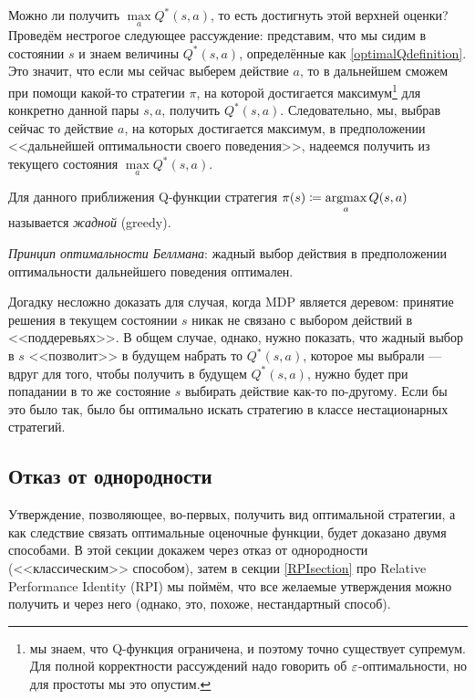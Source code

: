 Можно ли получить $\max\limits_{a} Q^*(s, a)$, то есть достигнуть этой верхней оценки? Проведём нестрогое следующее рассуждение: представим, что мы сидим в состоянии $s$ и знаем величины $Q^*(s, a)$, определённые как \eqref{optimalQdefinition}. Это значит, что если мы сейчас выберем действие $a$, то в дальнейшем сможем при помощи какой-то стратегии $\pi$, на которой достигается максимум\footnote{мы знаем, что Q-функция ограничена, и поэтому точно существует супремум. Для полной корректности рассуждений надо говорить об $\varepsilon$-оптимальности, но для простоты мы это опустим.} для конкретно данной пары $s, a$, получить $Q^*(s, a)$. Следовательно, мы, выбрав сейчас то действие $a$, на которых достигается максимум, в предположении <<дальнейшей оптимальности своего поведения>>, надеемся получить из текущего состояния $\max\limits_a Q^*(s, a)$.

\begin{definition}\label{greedy}
Для данного приближения Q-функции стратегия $\pi(s) \coloneqq \mathop{\mathrm{argmax}}\limits_a Q(s, a)$ называется \emph{жадной} (greedy).
\end{definition}

\begin{definition}
\emph{Принцип оптимальности Беллмана}: жадный выбор действия в предположении оптимальности дальнейшего поведения оптимален.
\end{definition}

Догадку несложно доказать для случая, когда MDP является деревом: принятие решения в текущем состоянии $s$ никак не связано с выбором действий в <<поддеревьях>>. В общем случае, однако, нужно показать, что жадный выбор в $s$ <<позволит>> в будущем набрать то $Q^*(s, a)$, которое мы выбрали --- вдруг для того, чтобы получить в будущем $Q^*(s, a)$, нужно будет при попадании в то же состояние $s$ выбирать действие как-то по-другому. Если бы это было так, было бы оптимально искать стратегию в классе нестационарных стратегий.

\subsection{Отказ от однородности}

Утверждение, позволяющее, во-первых, получить вид оптимальной стратегии, а как следствие связать оптимальные оценочные функции, будет доказано двумя способами. В этой секции докажем через отказ от однородности (<<классическим>> способом), затем в секции \ref{RPIsection} про Relative Performance Identity (RPI) мы поймём, что все желаемые утверждения можно получить и через него (однако, это, похоже, нестандартный способ).

